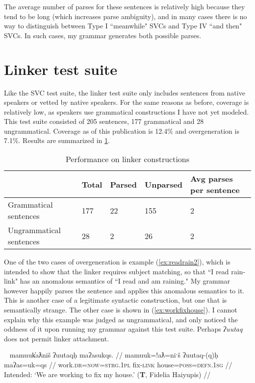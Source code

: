 The average number of parses for these sentences is relatively high because they tend to be long (which increases parse ambiguity), and in many cases there is no way to distinguish between Type I ``meanwhile" SVCs and Type IV ``and then" SVCs. In such cases, my grammar generates both possible parses.

\section{Linker test suite} \label{ch:results:link}

Like the SVC test suite, the linker test suite only includes sentences from native speakers or vetted by native speakers. For the same reasons as before, coverage is relatively low, as speakers use grammatical constructions I have not yet modeled. This test suite consisted of 205 sentences, 177 grammatical and 28 ungrammatical. Coverage as of this publication is 12.4\% and overgeneration is 7.1\%. Results are summarized in \cref{table:link-coverage}.

\vspace{-10pt}

\begin{table}[H]
\centering
\caption{Performance on linker constructions}
\label{table:link-coverage}
\begin{tabular}{l|llll}
 & Total & Parsed & Unparsed & Avg parses per sentence \\ \hline
Grammatical sentences & 177 & 22 & 155 & 2 \\ \hline
Ungrammatical sentences & 28 & 2 & 26 & 2
\end{tabular}
\end{table}

\vspace{-10pt}

One of the two cases of overgeneration is example (\ref{ex:readrain2}), which is intended to show that the linker requires subject matching, so that ``I read rain-link" has an anomalous semantics of ``I read and am raining." My grammar however happily parses the sentence and applies this anomalous semantics to it. This is another case of a legitimate syntactic construction, but one that is semantically strange. The other case is shown in (\ref{ex:workfixhouse}). I cannot explain why this example was judged as ungrammatical, and only noticed the oddness of it upon running my grammar against this test suite. Perhaps \textit{ʔuutaq} does not permit linker attachment.

\ex~ \label{ex:workfixhouse}
\begingl
\glpreamble *mamuuk̓aƛniš ʔuutaqḥ maʔasukqs. //
\gla mamuuk=!aƛ=niˑš ʔuutaq-(q)ḥ maʔas=uk=qs //
\glb work.\textsc{dr}=\textsc{now}=\textsc{strg.1pl} fix-\textsc{link} house=\textsc{poss}=\textsc{defn.1sg} //
\glft Intended: `We are working to fix my house.' (\textbf{T}, Fidelia Haiyupis) //
\endgl
\xe

